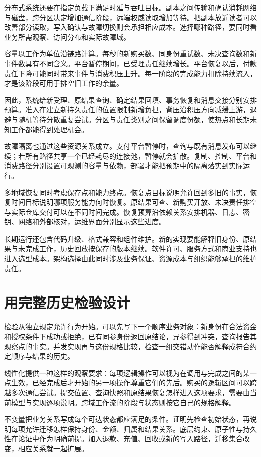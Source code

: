 分布式系统还要在指定负载下满足时延与吞吐目标。副本之间传输和确认消耗网络与磁盘，跨分区决定增加通信阶段，远端权威读取增加等待。把副本放近读者可以改善部分读取，写入确认与故障切换则会承担相应成本。选择哪种路径，要同时看业务所需观察、访问分布和实际故障域。

容量以工作为单位沿链路计算。每秒的新购买数、同身份重试数、未决查询数和新事件数具有不同含义。平台暂停期间，已受理责任继续增长。平台恢复以后，付款责任下降可能同时带来事件与消费积压上升。每一阶段的完成能力扣除持续流入，才是该阶段可用于排空旧工作的余量。

因此，系统给新受理、原结果查询、确定结果回填、事务恢复和消息交接分别安排预算。准入在建立新持久责任的位置限制新增负担，背压沿积压方向减缓上游，退避与随机等待分散重复尝试。分区与责任类别之间保留调度份额，使热点和长期未知工作都能得到处理机会。

故障隔离也通过这些资源关系成立。支付平台暂停时，查询与既有消息发布可以继续；若所有路径共享一个已经耗尽的连接池，暂停就会扩散。复制、控制、平台和消费路径分别设置可观测的容量与依赖，部署才能把预期中的隔离落实到实际运行。

多地域恢复同时考虑保存点和能力终点。恢复点目标说明允许回到多旧的事实，恢复时间目标说明哪项服务能力何时恢复。原结果可查、新购买开放、未决责任排空与实际仓库交付可以在不同时间完成。恢复预算沿依赖关系安排机器、日志、密钥、网络和外部核对，运维界面分别显示这些进度。

长期运行还包含代码升级、格式兼容和组件维护。新的实现要能解释旧身份、原结果与未完成工作，历史回放按保存的版本继续。软件许可、服务方式和商业支持也进入选型成本。架构选择由此同时涉及业务保证、资源成本与组织能够承担的维护责任。

\section*{用完整历史检验设计}

检验从独立规定允许行为开始。可以先写下一个顺序业务对象：新身份在合法资金和授权条件下成功或拒绝，已有同参身份返回原结论，异参得到冲突，查询报告其观察点的事实。并发实现再与这份规格比较，检查一组交错动作能否解释成符合约定顺序与结果的历史。

线性化提供一种这样的观察要求：每项逻辑操作可以视为在调用与完成之间的某一点生效，已经完成后才开始的另一项操作尊重它们的先后。购买的逻辑区间可以跨越多次通信尝试。提交位置、查询快照和原结果恢复怎样进入这项要求，需要由当前模型与实现逐项说明。跨域工作流的阶段与状态则按它自己的规格解释。

不变量把业务关系写成每个可达状态都应满足的条件。证明先检查初始状态，再说明每项允许迁移怎样保持身份、金额、归属和结果关系。底层约束、原子性与持久性在论证中作为明确前提。加入退款、充值、回收或新的写入路径，迁移集合改变，相应关系就一起扩展。

